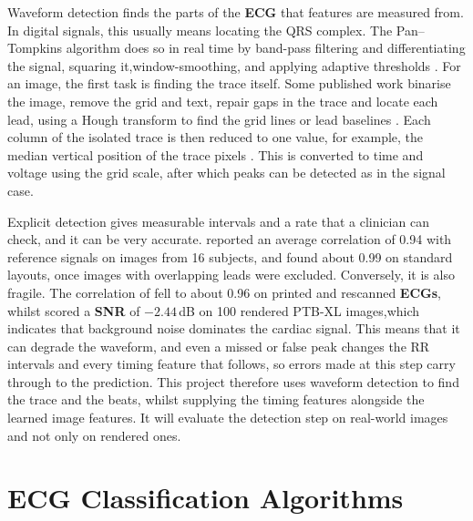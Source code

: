 Waveform detection finds the parts of the \textbf{ECG} that features are measured from. In digital
signals, this usually means locating the QRS complex. The Pan--Tompkins algorithm does so in real time by band-pass filtering and differentiating the signal, squaring it,window-smoothing, and applying adaptive thresholds \cite{pan_real-time_1985}. For an image, the first task is finding the trace itself. Some published work binarise the image,
remove the grid and text, repair gaps in the trace and locate each lead, using a Hough transform to find the grid lines or lead baselines
\cite{wu_automated_2022}. Each column of the isolated trace is then
reduced to one value, for example, the median vertical position of the trace pixels \cite{wu_automated_2022}. This is converted to time and voltage using the grid scale, after which peaks can be detected as in the signal case.

Explicit detection gives measurable intervals and a rate that a clinician can check, and
it can be very accurate. \textcite{randazzo_development_2022} reported an average correlation of
0.94 with reference signals on images from 16 subjects, and \textcite{wu_automated_2022}
 found about 0.99 on standard layouts, once images with overlapping leads were excluded. Conversely, it is also
fragile. The correlation of \textcite{wu_automated_2022} fell to about 0.96 on printed and
rescanned \textbf{ECGs}, whilst \textcite{wadehn_ecg_2024} scored a
\textbf{SNR} of $-2.44$\,dB on 100 rendered PTB-XL images,which indicates that background noise dominates the cardiac signal. This means that it can degrade the waveform, and even a missed or false peak changes the RR intervals and every timing feature
that follows, so errors made at this step carry through to the prediction. This project therefore
uses waveform detection to find the trace and the beats, whilst supplying  the timing features
alongside the learned image features. It will evaluate the detection step on real-world images
and not only on rendered ones.

\section{ECG Classification Algorithms}
\label{sec:ml-ecg}


